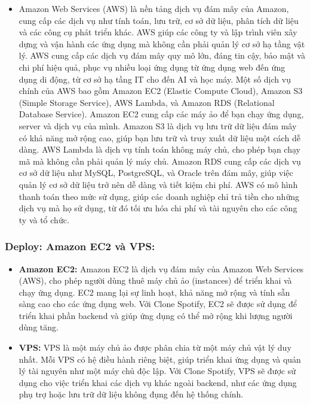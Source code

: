 \begin{itemize}
    \item Amazon Web Services (AWS) là nền tảng dịch vụ đám mây của Amazon, cung cấp các dịch vụ như tính toán, lưu trữ, cơ sở dữ liệu, phân tích dữ liệu và các công cụ phát triển khác. AWS giúp các công ty và lập trình viên xây dựng và vận hành các ứng dụng mà không cần phải quản lý cơ sở hạ tầng vật lý. AWS cung cấp các dịch vụ đám mây quy mô lớn, đáng tin cậy, bảo mật và chi phí hiệu quả, phục vụ nhiều loại ứng dụng từ ứng dụng web đến ứng dụng di động, từ cơ sở hạ tầng IT cho đến AI và học máy. Một số dịch vụ chính của AWS bao gồm Amazon EC2 (Elastic Compute Cloud), Amazon S3 (Simple Storage Service), AWS Lambda, và Amazon RDS (Relational Database Service). Amazon EC2 cung cấp các máy ảo để bạn chạy ứng dụng, server và dịch vụ của mình. Amazon S3 là dịch vụ lưu trữ dữ liệu đám mây có khả năng mở rộng cao, giúp bạn lưu trữ và truy xuất dữ liệu một cách dễ dàng. AWS Lambda là dịch vụ tính toán không máy chủ, cho phép bạn chạy mã mà không cần phải quản lý máy chủ. Amazon RDS cung cấp các dịch vụ cơ sở dữ liệu như MySQL, PostgreSQL, và Oracle trên đám mây, giúp việc quản lý cơ sở dữ liệu trở nên dễ dàng và tiết kiệm chi phí. AWS có mô hình thanh toán theo mức sử dụng, giúp các doanh nghiệp chỉ trả tiền cho những dịch vụ mà họ sử dụng, từ đó tối ưu hóa chi phí và tài nguyên cho các công ty và tổ chức.
\end{itemize}

\subsubsection{ Deploy: Amazon EC2 và VPS:}
\begin{itemize}
    \item \textbf{Amazon EC2:} Amazon EC2 là dịch vụ đám mây của Amazon Web Services (AWS), cho phép người dùng thuê máy chủ ảo (instances) để triển khai và chạy ứng dụng. EC2 mang lại sự linh hoạt, khả năng mở rộng và tính sẵn sàng cao cho các ứng dụng web. Với Clone Spotify, EC2 sẽ được sử dụng để triển khai phần backend và giúp ứng dụng có thể mở rộng khi lượng người dùng tăng.
    \item \textbf{VPS:} VPS là một máy chủ ảo được phân chia từ một máy chủ vật lý duy nhất. Mỗi VPS có hệ điều hành riêng biệt, giúp triển khai ứng dụng và quản lý tài nguyên như một máy chủ độc lập. Với Clone Spotify, VPS sẽ được sử dụng cho việc triển khai các dịch vụ khác ngoài backend, như các ứng dụng phụ trợ hoặc lưu trữ dữ liệu không đụng đến hệ thống chính.
\end{itemize}